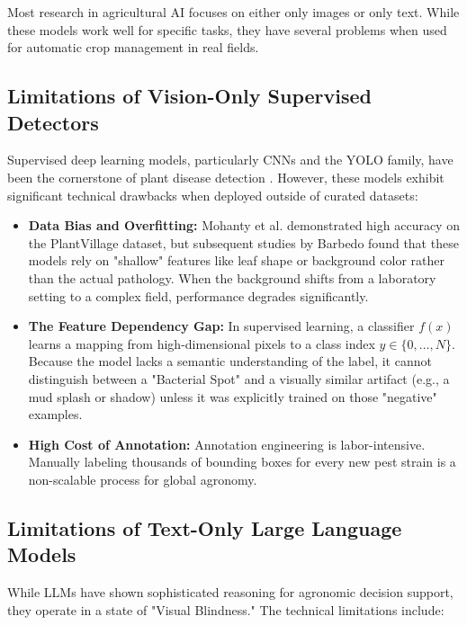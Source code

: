 Most research in agricultural AI focuses on either only images or only text. While these models work well for specific tasks, they have several problems when used for automatic crop management in real fields.

\subsection{Limitations of Vision-Only Supervised Detectors}
Supervised deep learning models, particularly CNNs and the YOLO family, have been the cornerstone of plant disease detection \cite{kamilaris2018deep, ferentinos2018deep}. However, these models exhibit significant technical drawbacks when deployed outside of curated datasets:

\begin{itemize}
	\item \textbf{Data Bias and Overfitting:} Mohanty et al. \cite{mohanty2016using} demonstrated high accuracy on the PlantVillage dataset, but subsequent studies by Barbedo \cite{barbedo2018impact} found that these models rely on "shallow" features like leaf shape or background color rather than the actual pathology. When the background shifts from a laboratory setting to a complex field, performance degrades significantly.
	\item \textbf{The Feature Dependency Gap:} In supervised learning, a classifier $f(x)$ learns a mapping from high-dimensional pixels to a class index $y \in \{0, \dots, N\}$. Because the model lacks a semantic understanding of the label, it cannot distinguish between a "Bacterial Spot" and a visually similar artifact (e.g., a mud splash or shadow) unless it was explicitly trained on those "negative" examples.
	\item \textbf{High Cost of Annotation:} Annotation engineering is labor-intensive. Manually labeling thousands of bounding boxes for every new pest strain is a non-scalable process for global agronomy.
\end{itemize}

\subsection{Limitations of Text-Only Large Language Models}
While LLMs have shown sophisticated reasoning for agronomic decision support, they operate in a state of "Visual Blindness." The technical limitations include:

